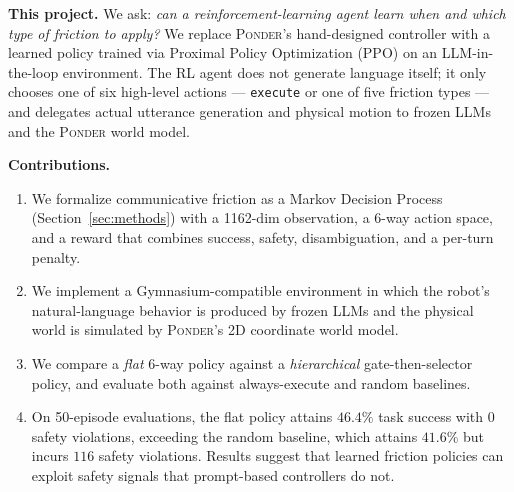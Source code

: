 \noindent\textbf{This project.} We ask: \emph{can a reinforcement-learning agent learn when and which type of friction to apply?} We replace \textsc{Ponder}'s hand-designed controller with a learned policy trained via Proximal Policy Optimization (PPO) \cite{schulman2017ppo} on an LLM-in-the-loop environment. The RL agent does not generate language itself; it only chooses one of six high-level actions --- \texttt{execute} or one of five friction types --- and delegates actual utterance generation and physical motion to frozen LLMs and the \textsc{Ponder} world model.

\noindent\textbf{Contributions.}
\begin{enumerate}
    \item We formalize communicative friction as a Markov Decision Process (Section~\ref{sec:methods}) with a 1162-dim observation, a 6-way action space, and a reward that combines success, safety, disambiguation, and a per-turn penalty.
    \item We implement a Gymnasium-compatible environment in which the robot's natural-language behavior is produced by frozen LLMs and the physical world is simulated by \textsc{Ponder}'s 2D coordinate world model.
    \item We compare a \emph{flat} 6-way policy against a \emph{hierarchical} gate-then-selector policy, and evaluate both against always-execute and random baselines.
    \item On 50-episode evaluations, the flat policy attains $46.4\%$ task success with $0$ safety violations, exceeding the random baseline, which attains $41.6\%$ but incurs $116$ safety violations. Results suggest that learned friction policies can exploit safety signals that prompt-based controllers do not.
\end{enumerate}
